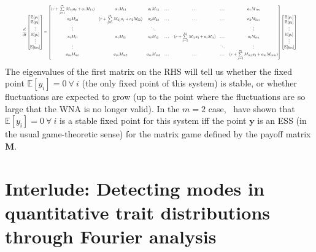 \begin{equation}
\resizebox{0.93\textwidth}{!}{$\displaystyle
	\frac{d}{dt}\begin{bmatrix}
	\mathbb{E}[y_1]\\
	\mathbb{E}[y_2]\\
	\vdots\\
	\mathbb{E}[y_i]\\
	\vdots\\
	\mathbb{E}[y_m]
	\end{bmatrix}
	=
	\begin{bmatrix}
	(r + \sum\limits_{j=1}^{m}M_{1j}a_j + a_1M_{11}) & a_1M_{12} & a_1M_{13} & \dots & \dots & \dots & a_1M_{1m}\\
	a_2M_{21} & (r + \sum\limits_{j=1}^{m}M_{2j}a_j + a_2M_{22}) & a_2M_{23} & \dots & \dots & \dots & a_2M_{2m}\\
	\vdots &  & \ddots & &  & & \vdots\\
	a_{i}M_{i1} & a_iM_{i2} & a_iM_{i3} & \dots & (r + \sum\limits_{j=1}^{m}M_{ij}a_j + a_iM_{ii}) & \dots & a_iM_{im}\\
	\vdots &  &  & & & \ddots & \vdots\\
	a_mM_{m1} & a_mM_{m2} & a_mM_{m3} & \dots & \dots & \dots & (r + \sum\limits_{j=1}^{m}M_{mj}a_j + a_mM_{mm})
	\end{bmatrix}
	\begin{bmatrix}
	\mathbb{E}[y_1]\\
	\mathbb{E}[y_2]\\
	\vdots\\
	\mathbb{E}[y_i]\\
	\vdots\\
	\mathbb{E}[y_m]
	\end{bmatrix}
	$}
\end{equation}
The eigenvalues of the first matrix on the RHS will tell us whether the fixed point $\mathbb{E}[y_i] = 0 \ \forall \ i$ (the only fixed point of this system) is stable, or whether fluctuations are expected to grow (up to the point where the fluctuations are so large that the WNA is no longer valid). In the $m=2$ case,~\cite{tao_stochastic_2007} have shown that $\mathbb{E}[y_i] = 0 \ \forall \ i$ is a stable fixed point for this system iff the point $\mathbf{y}$ is an ESS (in the usual game-theoretic sense) for the matrix game defined by the payoff matrix $\mathbf{M}$.

\section{Interlude: Detecting modes in quantitative trait distributions through Fourier analysis}

